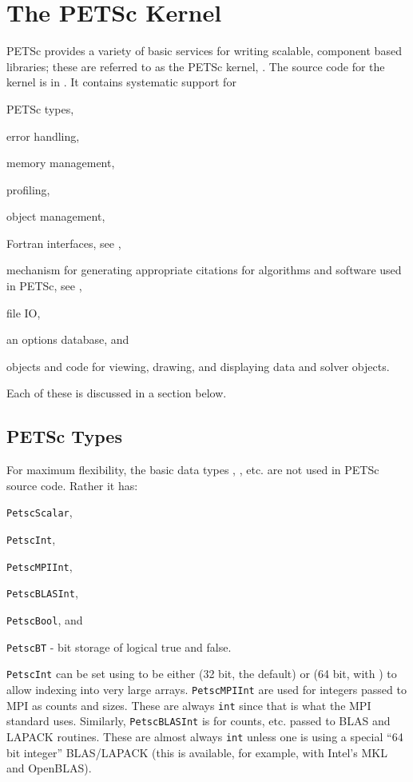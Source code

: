 \chapter{The PETSc Kernel}
\label{chapter:kernel}
PETSc provides a variety of basic services for writing scalable, component
based libraries; these are referred to as the PETSc kernel, \cite{bgms98}. The source
code for the kernel is in . It contains systematic support for
\begin{tightitemize}
  \item PETSc types,
  \item error handling,
  \item memory management,
  \item profiling,
  \item object management,
  \item Fortran interfaces, see \cite{BalayBrownKnepleyMcInnesSmith2015},
  \item mechanism for generating appropriate citations for algorithms and software used in PETSc, see \cite{knepley2013accurately},
  \item file IO,
  \item an options database, and
  \item objects and code for viewing, drawing, and displaying data and solver objects.
\end{tightitemize}
Each of these is discussed in a section below.

\section{PETSc Types}
For maximum flexibility, the basic data types , , etc. are
 not used in PETSc source code. Rather it has:
\begin{tightitemize}
  \item \lstinline{PetscScalar},
  \item \lstinline{PetscInt},
  \item \lstinline{PetscMPIInt},
  \item \lstinline{PetscBLASInt},
  \item \lstinline{PetscBool}, and
  \item \lstinline{PetscBT} - bit storage of logical true and false.
\end{tightitemize}
\lstinline{PetscInt} can be set using  to be either  (32 bit, the default) or 
(64 bit, with ) to allow indexing into very large arrays.
\lstinline{PetscMPIInt} are used for integers passed to MPI as counts and sizes.
These are always \lstinline{int} since that is what the MPI standard uses.
Similarly, \lstinline{PetscBLASInt} is for counts, etc. passed to BLAS and LAPACK routines.
These are almost always \lstinline{int} unless one is using a special ``64 bit integer'' BLAS/LAPACK (this is available, for
example,  with Intel's MKL and OpenBLAS).

